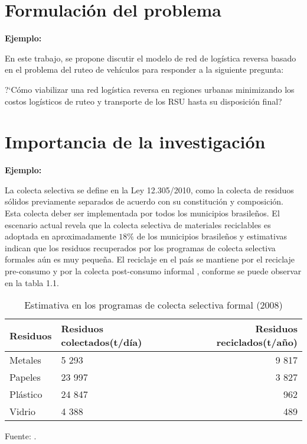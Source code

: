 \section{Formulación del problema}

{\bf Ejemplo:}\par

  En este trabajo, se propone discutir el modelo de red  de logística reversa basado en el problema del ruteo de vehículos para responder a la siguiente pregunta:
 \begin{center} 
     ?`Cómo viabilizar una red logística reversa en regiones urbanas minimizando los costos logísticos de ruteo y transporte de los RSU hasta su disposición final?
 \end{center}

\section{Importancia de la investigación} 

{\bf Ejemplo:}\par

La colecta selectiva se define en la Ley 12.305/2010, como la colecta de residuos sólidos previamente separados de acuerdo con su constitución y composición. Esta colecta deber ser implementada por todos los municipios brasileños. 
\vskip 0.3cm
El escenario actual revela que la colecta selectiva de materiales reciclables es adoptada en aproximadamente $18\%$ de los municipios brasileños y estimativas indican que los residuos recuperados por los programas de colecta selectiva formales aún es muy pequeña. El reciclaje en el país se mantiene por el reciclaje pre-consumo y por la colecta post-consumo informal , conforme se puede observar en la tabla 1.1.

\begin{center}
\begin{table}[h!]
\centering
\caption{Estimativa en los programas de colecta selectiva formal (2008)}
\begin{tabular}{llr} \toprule
Residuos & Residuos colectados(t/día) & Residuos reciclados(t/año) \\ \midrule
Metales & 5 293 & 9 817 \\
Papeles & 23 997 & 3 827 \\
Plástico & 24 847 & 962 \\
Vidrio & 4 388 & 489 \\ \bottomrule
\end{tabular}
\vskip 0.2cm
\begin{center}
{\small{Fuente: \cite{MMA}.}}
\end{center}
\end{table}
\end{center}
\vskip 0.5cm

